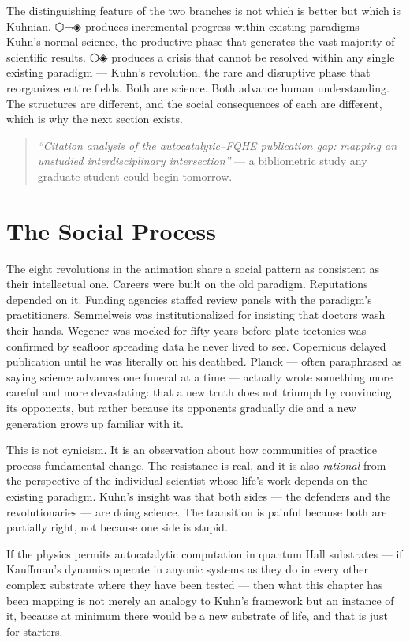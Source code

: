 The distinguishing feature of the two branches is not which is better but which is Kuhnian. ⬡¬◈ produces incremental progress within existing paradigms --- Kuhn's normal science, the productive phase that generates the vast majority of scientific results. ⬡◈ produces a crisis that cannot be resolved within any single existing paradigm --- Kuhn's revolution, the rare and disruptive phase that reorganizes entire fields. Both are science. Both advance human understanding. The structures are different, and the social consequences of each are different, which is why the next section exists.

\begin{quote}\small
\textit{``Citation analysis of the autocatalytic--FQHE publication gap: mapping an unstudied interdisciplinary intersection''} --- a bibliometric study any graduate student could begin tomorrow.
\end{quote}

\section*{The Social Process}
\label{spine:sr-social-process}

The eight revolutions in the animation share a social pattern as consistent as their intellectual one. Careers were built on the old paradigm. Reputations depended on it. Funding agencies staffed review panels with the paradigm's practitioners. Semmelweis was institutionalized for insisting that doctors wash their hands. Wegener was mocked for fifty years before plate tectonics was confirmed by seafloor spreading data he never lived to see. Copernicus delayed publication until he was literally on his deathbed. Planck --- often paraphrased as saying science advances one funeral at a time --- actually wrote something more careful and more devastating: that a new truth does not triumph by convincing its opponents, but rather because its opponents gradually die and a new generation grows up familiar with it.

This is not cynicism. It is an observation about how communities of practice process fundamental change. The resistance is real, and it is also \emph{rational} from the perspective of the individual scientist whose life's work depends on the existing paradigm. Kuhn's insight was that both sides --- the defenders and the revolutionaries --- are doing science. The transition is painful because both are partially right, not because one side is stupid.

If the physics permits autocatalytic computation in quantum Hall substrates --- if Kauffman's dynamics operate in anyonic systems as they do in every other complex substrate where they have been tested --- then what this chapter has been mapping is not merely an analogy to Kuhn's framework but an instance of it, because at minimum there would be a new substrate of life, and that is just for starters.

